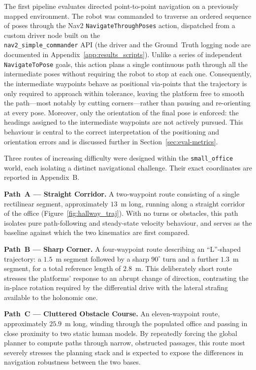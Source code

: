 The first pipeline evaluates directed point-to-point navigation on a previously mapped environment. The robot was commanded to traverse an ordered sequence of poses through the Nav2 \texttt{NavigateThroughPoses} action, dispatched from a custom driver node built on the \\ \texttt{nav2\_simple\_commander} API (the driver and the Ground~Truth logging node are documented in Appendix~\ref{app:results_scripts}). Unlike a series of independent \texttt{NavigateToPose} goals, this action plans a single continuous path through all the intermediate poses without requiring the robot to stop at each one. Consequently, the intermediate waypoints behave as positional via-points that the trajectory is only required to approach within tolerance, leaving the platform free to smooth the path---most notably by cutting corners---rather than pausing and re-orienting at every pose. Moreover, only the orientation of the final pose is enforced: the headings assigned to the intermediate waypoints are not actively pursued. This behaviour is central to the correct interpretation of the positioning and orientation errors and is discussed further in Section~\ref{sec:eval-metrics}.

Three routes of increasing difficulty were designed within the \texttt{small\_office} world, each isolating a distinct navigational challenge. Their exact coordinates are reported in Appendix~B.

\textbf{Path~A --- Straight Corridor.} A two-waypoint route consisting of a single rectilinear segment, approximately $13$~m long, running along a straight corridor of the office (Figure~\ref{fig:hallway_traj}). With no turns or obstacles, this path isolates pure path-following and steady-state velocity behaviour, and serves as the baseline against which the two kinematics are first compared.

\textbf{Path~B --- Sharp Corner.} A four-waypoint route describing an ``L''-shaped trajectory: a $1.5$~m segment followed by a sharp $90^{\circ}$ turn and a further $1.3$~m segment, for a total reference length of $2.8$~m. This deliberately short route stresses the platforms' response to an abrupt change of direction, contrasting the in-place rotation required by the differential drive with the lateral strafing available to the holonomic one.

\textbf{Path~C --- Cluttered Obstacle Course.} An eleven-waypoint route, approximately $25.9$~m long, winding through the populated office and passing in close proximity to two static human models. By repeatedly forcing the global planner to compute paths through narrow, obstructed passages, this route most severely stresses the planning stack and is expected to expose the differences in navigation robustness between the two bases.

